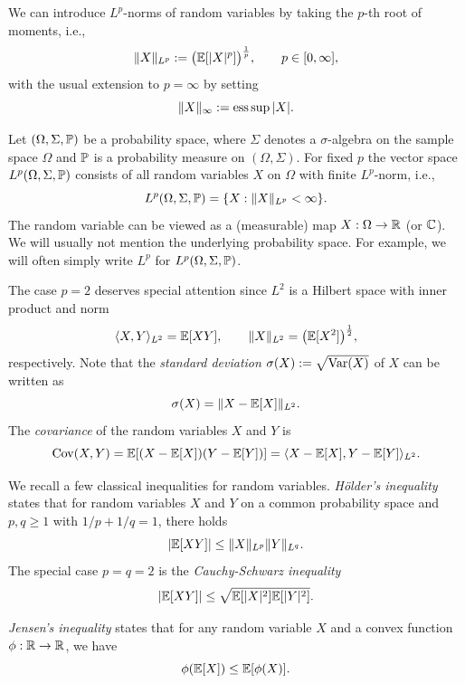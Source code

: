We can introduce $L^p$-norms of random variables by taking the $p$-th root of moments, i.e.,
$$\|X\|_{L^p} := \big(\E[|X|^p]\big)^{\frac{1}{p}}, \qquad p \in [0,\infty],$$
with the usual extension to $p=\infty$ by setting
$$\|X\|_{\infty} := \ess \sup |X|.$$

Let $(\Omega,\Sigma,\P)$ be a probability space, where $\Sigma$ denotes a $\sigma$-algebra on the sample space
$\Omega$ and $\P$ is a probability measure on $(\Omega,\Sigma).$ For fixed $p$ the vector space
$L^p(\Omega,\Sigma,\P)$ consists of all random variables $X$ on $\Omega$ with finite $L^p$-norm, i.e.,
$$L^p(\Omega,\Sigma,\P) = \{X : \|X\|_{L^p} < \infty\}.$$
The random variable can be viewed as a (measurable) map $X:\Omega\to\RR$ (or $\CC$). We will usually not mention the underlying probability space. For example, we will often simply write $L^p$ for $L^p(\Omega,\Sigma,\P)$.

The case $p=2$ deserves special attention since $L^2$ is a Hilbert space with inner product and norm
$$\langle X, Y \rangle_{L^2} = \E[XY], \qquad \|X\|_{L^2} = \big(\E [X^2] \big)^{\frac{1}{2}},$$
respectively. Note that the {\em standard deviation} $\sigma(X):=\sqrt{\Var(X)}$ of $X$ can be written as
$$\sigma(X) = \| X - \E[X] \|_{L^2}.$$
The {\em covariance} of the random variables $X$ and $Y$ is
\begin{equation}
\label{covariance}
\cov(X,Y) = \E [ (X - \E[X]) (Y - \E [Y])]  = \langle X - \E[X], Y - \E [Y] \rangle_{L^2} .
\end{equation}


We recall a few classical inequalities for random variables. {\em H\"older's inequality} states that for random variables $X$ and $Y$ on a common probability space and $p,q \ge 1$ with $1/p +1/q =1$, there holds
\begin{equation}
\label{hoelder}
| \E [XY] | \le  \|X\|_{L^p} \|Y\|_{L^q}. %
\end{equation}
The special case $p=q=2$ is the {\em Cauchy-Schwarz inequality}
\begin{equation}
\label{cauchy-schwarz}
 | \E [XY] | \le \sqrt{ \E [|X|^2] \E [|Y|^2]}.
\end{equation}


{\em Jensen's inequality} states that for any random variable $X$ and a convex function $\phi: \R \to \R$, we have
\begin{equation}
\label{Jensen}
\phi(\E[X]) \le \E [\phi(X)].
\end{equation}

